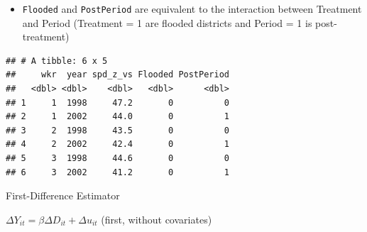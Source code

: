 \documentclass[ignorenonframetext,]{beamer}
\newenvironment{Shaded}{\begin{snugshade}}{\end{snugshade}}
\newcommand{\KeywordTok}[1]{\textcolor[rgb]{0.13,0.29,0.53}{\textbf{#1}}}
\newcommand{\DataTypeTok}[1]{\textcolor[rgb]{0.13,0.29,0.53}{#1}}
\newcommand{\StringTok}[1]{\textcolor[rgb]{0.31,0.60,0.02}{#1}}
\newcommand{\CommentTok}[1]{\textcolor[rgb]{0.56,0.35,0.01}{\textit{#1}}}
\newcommand{\OperatorTok}[1]{\textcolor[rgb]{0.81,0.36,0.00}{\textbf{#1}}}
\newcommand{\NormalTok}[1]{#1}
\providecommand{\tightlist}{%
  \setlength{\itemsep}{0pt}\setlength{\parskip}{0pt}}
\begin{document}
\begin{frame}[fragile]{}

\begin{itemize}[<+->]
\tightlist
\item
  \texttt{Flooded} and \texttt{PostPeriod} are equivalent to the
  interaction between Treatment and Period (Treatment = 1 are flooded
  districts and Period = 1 is post-treatment)
\end{itemize}

\small

\begin{Shaded}
\end{Shaded}

\begin{verbatim}
## # A tibble: 6 x 5
##     wkr  year spd_z_vs Flooded PostPeriod
##   <dbl> <dbl>    <dbl>   <dbl>      <dbl>
## 1     1  1998     47.2       0          0
## 2     1  2002     44.0       0          1
## 3     2  1998     43.5       0          0
## 4     2  2002     42.4       0          1
## 5     3  1998     44.6       0          0
## 6     3  2002     41.2       0          1
\end{verbatim}

\normalsize

\end{frame}

\begin{frame}[fragile]{First-Difference Estimator}

\(\Delta Y_{it} = \beta \Delta D_{it} + \Delta u_{it}\) (first, without
covariates)

\begin{Shaded}
\end{Shaded}

\end{frame}
\end{document}
